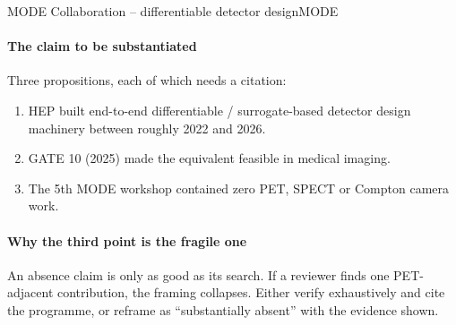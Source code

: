  
\begin{programnote}{MODE Collaboration -- differentiable detector design}{MODE}
 
 
\paragraph{The claim to be substantiated}
Three propositions, each of which needs a citation:
\begin{enumerate}
	\item HEP built end-to-end differentiable / surrogate-based detector design
		machinery between roughly 2022 and 2026. 
	\item GATE 10 (2025) made the equivalent feasible in medical imaging.
	\item The 5th MODE workshop contained zero PET, SPECT or Compton camera
		work. 
\end{enumerate}
 
\paragraph{Why the third point is the fragile one}
An absence claim is only as good as its search. If a reviewer finds one
PET-adjacent contribution, the framing collapses. Either verify exhaustively and
cite the programme, or reframe as ``substantially absent'' with the evidence
shown.
 
\end{programnote}
 
 
 
